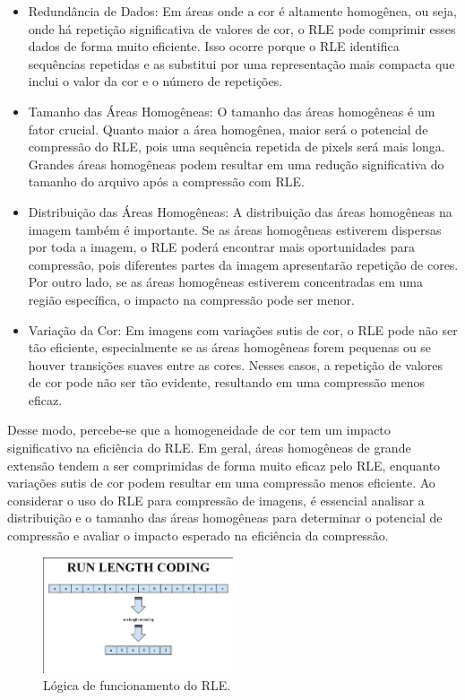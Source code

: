 \documentclass{article}
\begin{document}
\begin{itemize}
    \item Redundância de Dados: Em áreas onde a cor é altamente homogênea, ou seja, onde há repetição significativa de valores de cor, o RLE pode comprimir esses dados de forma muito eficiente. Isso ocorre porque o RLE identifica sequências repetidas e as substitui por uma representação mais compacta que inclui o valor da cor e o número de repetições.

    \item Tamanho das Áreas Homogêneas: O tamanho das áreas homogêneas é um fator crucial. Quanto maior a área homogênea, maior será o potencial de compressão do RLE, pois uma sequência repetida de pixels será mais longa. Grandes áreas homogêneas podem resultar em uma redução significativa do tamanho do arquivo após a compressão com RLE.

    \item Distribuição das Áreas Homogêneas: A distribuição das áreas homogêneas na imagem também é importante. Se as áreas homogêneas estiverem dispersas por toda a imagem, o RLE poderá encontrar mais oportunidades para compressão, pois diferentes partes da imagem apresentarão repetição de cores. Por outro lado, se as áreas homogêneas estiverem concentradas em uma região específica, o impacto na compressão pode ser menor.

    \item Variação da Cor: Em imagens com variações sutis de cor, o RLE pode não ser tão eficiente, especialmente se as áreas homogêneas forem pequenas ou se houver transições suaves entre as cores. Nesses casos, a repetição de valores de cor pode não ser tão evidente, resultando em uma compressão menos eficaz.
\end{itemize}

Desse modo, percebe-se que a homogeneidade de cor tem um impacto significativo na eficiência do RLE. Em geral, áreas homogêneas de grande extensão tendem a ser comprimidas de forma muito eficaz pelo RLE, enquanto variações sutis de cor podem resultar em uma compressão menos eficiente. Ao considerar o uso do RLE para compressão de imagens, é essencial analisar a distribuição e o tamanho das áreas homogêneas para determinar o potencial de compressão e avaliar o impacto esperado na eficiência da compressão.

\begin{figure}[htbp]
    \centering
    \includegraphics[width=0.5\textwidth]{RLE.png}
    \caption{Lógica de funcionamento do RLE.}
    \label{fig:imagem}
\end{figure}
\end{document}
